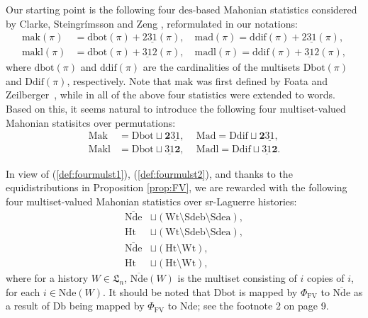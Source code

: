 \documentclass[12pt]{amsart}
\numberwithin{equation}{section}
\theoremstyle{plain}
\theoremstyle{definition}
\def\FV{\mathrm{FV}}
\def\LH{\mathfrak{L}}
\def\Sdeb{\mathrm{Sdeb}}
\def\Sdea{\mathrm{Sdea}}
\def\Nde{\mathrm{Nde}}
\def\Het{\mathrm{Ht}}
\def\Wt{\mathrm{Wt}}
\def\des{\mathrm{des}}
\def\Db{\mathrm{Db}}
\def\Ddif{\mathrm{Ddif}}
\def\ddif{\mathrm{ddif}}
\def\Dbot{\mathrm{Dbot}}
\def\dbot{\mathrm{dbot}}
\def\ppwrs{\mathrm{2\underline{31}}}
\def\pp31-2{\mathrm{\underline{31}2}}
\def\leftdescent{\mathrm{\underline{31}}\mathbf{2}}
\def\rightdescent{\mathrm{\mathbf{2}\underline{31}}}
\def\Mak{\mathrm{Mak}}
\def\Mad{\mathrm{Mad}}
\def\Makl{\mathrm{Makl}}
\def\Madl{\mathrm{Madl}}
\def\mak{\mathrm{mak}}
\def\mad{\mathrm{mad}}
\def\mak{\mathrm{mak}}
\def\makl{\mathrm{makl}}
\def\madl{\mathrm{madl}}
\begin{document}
Our starting point is the following four $\des$-based Mahonian statistics considered by Clarke, Steingr\'{i}msson and Zeng \cite{CSZ}, reformulated in our notations:
\begin{align*}
   \mak(\pi) &=\dbot(\pi)+\ppwrs(\pi), \,\,\,\,\,\, \mad(\pi)=\ddif(\pi)+\ppwrs(\pi),   \\
 \makl(\pi)&=\dbot(\pi)+\pp31-2(\pi),\,\,\,\,\,\,
  \madl(\pi)  =\ddif(\pi)+ \pp31-2(\pi),
\end{align*}
where $\dbot(\pi)$ and $\ddif(\pi)$ are the cardinalities of the multisets $\Dbot(\pi)$ and $\Ddif(\pi)$, respectively. Note that $\mak$ was first defined by Foata and Zeilberger~\cite{FZ90}, while in \cite{CSZ} all of the above four statistics were extended to words.
Based on this, it seems natural to introduce the following four multiset-valued Mahonian statisitcs over permutations:
\begin{align}
\label{def:fourmulst1}
  \Mak &=\Dbot \sqcup \rightdescent,    \,\,\,\,\,\,\,
  \Mad =\Ddif \sqcup \rightdescent,  \\
  \Makl &=\Dbot \sqcup \leftdescent,    \,\,\,\,\,\,\,
  \Madl =\Ddif \sqcup \leftdescent.
  \label{def:fourmulst2}
\end{align}

In view of (\ref{def:fourmulst1}), (\ref{def:fourmulst2}), and thanks to the equidistributions in Proposition \ref{prop:FV}, we are rewarded with the following four multiset-valued Mahonian statistics over sr-Laguerre
histories:
\begin{align}
\label{LH1}\overline{\Nde} &\sqcup (\Wt \setminus \Sdeb \setminus \Sdea),\\
\label{LH2}\Het &\sqcup (\Wt \setminus \Sdeb \setminus \Sdea),  \\
\label{LH3}\overline{\Nde} &\sqcup   (\Het \setminus \Wt),    \\
\label{LH4}\Het &\sqcup   (\Het \setminus \Wt),
\end{align}
where for a history $W\in\LH_n$, $\overline{\Nde}(W)$ is the multiset consisting of $i$ copies of $i$, for each $i \in \Nde(W)$. It should be noted that $\Dbot$ is mapped by $\Phi_{\FV}$
to $\overline{\Nde}$ as a result of $\Db$ being mapped by $\Phi_{\FV}$
to $\Nde$; see the footnote 2 on page 9.
\end{document}
